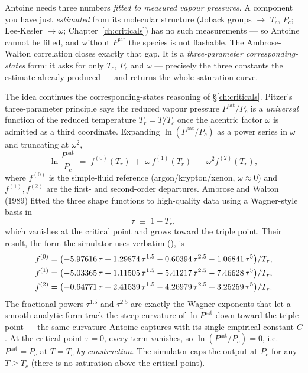 \documentclass[11pt,a4paper]{article}
\newcommand{\Psat}{P^{\mathrm{sat}}}
\begin{document}
Antoine needs three numbers \emph{fitted to measured vapour
pressures}.  A component you have just \emph{estimated} from its
molecular structure (Joback groups $\to$ $T_c$, $P_c$; Lee-Kesler
$\to \omega$; Chapter~\ref{ch:criticals}) has no such measurements ---
so Antoine cannot be filled, and without $\Psat$ the species is not
flashable.  The Ambrose-Walton correlation closes exactly that gap.
It is a \emph{three-parameter corresponding-states} form: it asks for
only $T_c$, $P_c$ and $\omega$ --- precisely the three constants the
estimate already produced --- and returns the whole saturation curve.

The idea continues the corresponding-states reasoning of
\S\ref{ch:criticals}.  Pitzer's three-parameter principle says the
reduced vapour pressure $\Psat/P_c$ is a \emph{universal} function of
the reduced temperature $T_r = T/T_c$ once the acentric factor
$\omega$ is admitted as a third coordinate.  Expanding $\ln(\Psat/P_c)$
as a power series in $\omega$ and truncating at $\omega^2$,
\begin{equation}\label{eq:aw-master}
   \ln\!\frac{\Psat}{P_c}
   \;=\; f^{(0)}(T_r) \;+\; \omega\,f^{(1)}(T_r)
        \;+\; \omega^2 f^{(2)}(T_r),
\end{equation}
where $f^{(0)}$ is the simple-fluid reference (argon/krypton/xenon,
$\omega \approx 0$) and $f^{(1)}, f^{(2)}$ are the first- and
second-order departures.  Ambrose and Walton (1989) fitted the three
shape functions to high-quality data using a Wagner-style basis in
\[
   \tau \;\equiv\; 1 - T_r,
\]
which vanishes at the critical point and grows toward the triple
point.  Their result, the form the simulator uses verbatim
(), is
\begin{align}
   f^{(0)} &= \bigl(-5.97616\,\tau + 1.29874\,\tau^{1.5}
              - 0.60394\,\tau^{2.5} - 1.06841\,\tau^{5}\bigr)/T_r, \notag\\
   f^{(1)} &= \bigl(-5.03365\,\tau + 1.11505\,\tau^{1.5}
              - 5.41217\,\tau^{2.5} - 7.46628\,\tau^{5}\bigr)/T_r, \label{eq:aw-shape}\\
   f^{(2)} &= \bigl(-0.64771\,\tau + 2.41539\,\tau^{1.5}
              - 4.26979\,\tau^{2.5} + 3.25259\,\tau^{5}\bigr)/T_r. \notag
\end{align}
The fractional powers $\tau^{1.5}$ and $\tau^{2.5}$ are exactly the
Wagner exponents that let a smooth analytic form track the steep
curvature of $\ln\Psat$ down toward the triple point --- the same
curvature Antoine captures with its single empirical constant $C$.
At the critical point $\tau = 0$, every term vanishes, so
$\ln(\Psat/P_c) = 0$, i.e.\ $\Psat = P_c$ at $T = T_c$ \emph{by
construction}.  The simulator caps the output at $P_c$ for any
$T \ge T_c$ (there is no saturation above the critical point).
\end{document}

